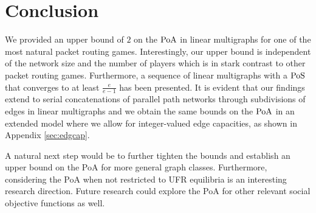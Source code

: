 \section{Conclusion}
We provided an upper bound of $2$ on the $\operatorname*{PoA}$ in linear multigraphs for one of the most natural packet routing games. Interestingly, our upper bound is independent of the network size and the number of players which is in stark contrast to other packet routing games. Furthermore, a sequence of linear multigraphs with a $\operatorname*{PoS}$ that converges to at least $\frac{e}{e-1}$ has been presented. 
It is evident that our findings extend to serial concatenations of parallel path networks through subdivisions of edges in linear multigraphs and we obtain the same bounds on the $\operatorname*{PoA}$ in an extended model where we allow for integer-valued edge capacities, as shown in Appendix \ref{sec:edgcap}. 

A natural next step would be to further tighten the bounds and establish an upper bound on the PoA for more general graph classes. Furthermore, considering the PoA when not restricted to UFR equilibria is an interesting research direction. Future research could explore the PoA for other relevant social objective functions as well.